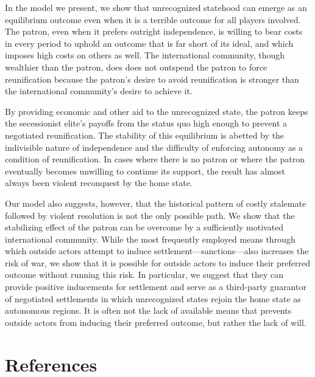 \documentclass[11pt,letterpaper, notitlepage]{article}
\begin{document}
In the model we present, we show that unrecognized statehood can emerge as an equilibrium outcome even when it is a terrible outcome for all players involved. The patron, even when it prefers outright independence, is willing to bear costs in every period to uphold an outcome that is far short of its ideal, and which imposes high costs on others as well. The international community, though wealthier than the patron, does does not outspend the patron to force reunification because the patron's desire to avoid reunification is stronger than the international community's desire to achieve it.  

By providing economic and other aid to the unrecognized state, the patron keeps the secessionist elite's payoffs from the status quo high enough to prevent a negotiated reunification. The stability of this equilibrium is abetted by the indivisible nature of independence and the difficulty of enforcing autonomy as a condition of reunification. In cases where there is no patron or where the patron eventually becomes unwilling to continue its support, the result has almost always been violent reconquest by the home state.

Our model also suggests, however, that the historical pattern of costly stalemate followed by violent resolution is not the only possible path. We show that the stabilizing effect of the patron can be overcome by a sufficiently motivated international community. While the most frequently employed means through which outside actors attempt to induce settlement---sanctions---also increases the risk of war, we show that it is possible for outside actors to induce their preferred outcome without running this risk. In particular, we suggest that they can provide positive inducements for settlement and serve as a third-party guarantor of negotiated settlements in which unrecognized states rejoin the home state as autonomous regions. It is often not the lack of available means that prevents outside actors from inducing their preferred outcome, but rather the lack of will.

\pagebreak

\section{References}\label{A:references}
\hangindent=1cm
\end{document}
